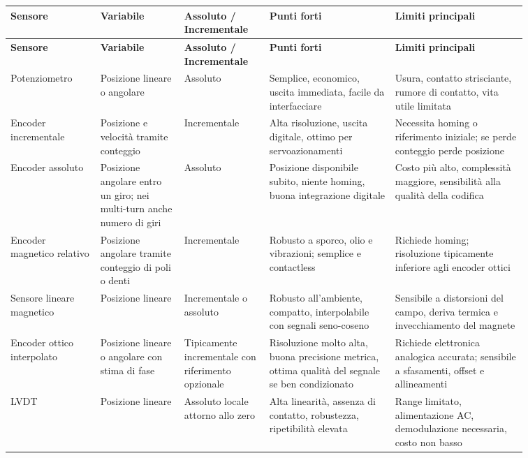 \documentclass[11pt,a4paper]{article}
\begin{document}
{\renewcommand{\arraystretch}{1.18}
\begin{longtable}{@{}>{\raggedright\arraybackslash}p{0.15\linewidth}>{\raggedright\arraybackslash}p{0.14\linewidth}>{\raggedright\arraybackslash}p{0.14\linewidth}>{\raggedright\arraybackslash}p{0.21\linewidth}>{\raggedright\arraybackslash}p{0.22\linewidth}@{}}
\toprule
\textbf{Sensore} & \textbf{Variabile} & \textbf{Assoluto / Incrementale} & \textbf{Punti forti} & \textbf{Limiti principali} \\
\midrule
\endfirsthead
\toprule
\textbf{Sensore} & \textbf{Variabile} & \textbf{Assoluto / Incrementale} & \textbf{Punti forti} & \textbf{Limiti principali} \\
\midrule
\endhead
Potenziometro & Posizione lineare o angolare & Assoluto & Semplice, economico, uscita immediata, facile da interfacciare & Usura, contatto strisciante, rumore di contatto, vita utile limitata \\
Encoder incrementale & Posizione e velocit\`a tramite conteggio & Incrementale & Alta risoluzione, uscita digitale, ottimo per servoazionamenti & Necessita homing o riferimento iniziale; se perde conteggio perde posizione \\
Encoder assoluto & Posizione angolare entro un giro; nei multi-turn anche numero di giri & Assoluto & Posizione disponibile subito, niente homing, buona integrazione digitale & Costo pi\`u alto, complessit\`a maggiore, sensibilit\`a alla qualit\`a della codifica \\
Encoder magnetico relativo & Posizione angolare tramite conteggio di poli o denti & Incrementale & Robusto a sporco, olio e vibrazioni; semplice e contactless & Richiede homing; risoluzione tipicamente inferiore agli encoder ottici \\
Sensore lineare magnetico & Posizione lineare & Incrementale o assoluto & Robusto all’ambiente, compatto, interpolabile con segnali seno-coseno & Sensibile a distorsioni del campo, deriva termica e invecchiamento del magnete \\
Encoder ottico interpolato & Posizione lineare o angolare con stima di fase & Tipicamente incrementale con riferimento opzionale & Risoluzione molto alta, buona precisione metrica, ottima qualit\`a del segnale se ben condizionato & Richiede elettronica analogica accurata; sensibile a sfasamenti, offset e allineamenti \\
LVDT & Posizione lineare & Assoluto locale attorno allo zero & Alta linearit\`a, assenza di contatto, robustezza, ripetibilit\`a elevata & Range limitato, alimentazione AC, demodulazione necessaria, costo non basso \\

\end{longtable}}
\end{document}
